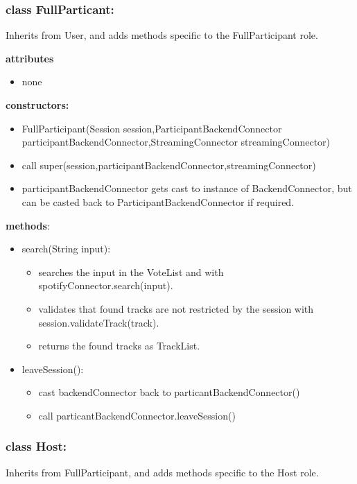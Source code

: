 \documentclass[oneside, ngerman]{sdqtechreport}
\begin{document}
\subsubsection{class FullParticant:}
Inherits from User, and adds methods specific to the FullParticipant role.

\textbf{attributes}
\begin{itemize}
    \item none
\end{itemize}
\textbf{constructors:}
\begin{itemize}
\item FullParticipant(Session session,ParticipantBackendConnector participantBackendConnector,StreamingConnector streamingConnector) 
\end{itemize}
\begin{itemize}
    \item call super(session,participantBackendConnector,streamingConnector)
    \item participantBackendConnector gets cast to instance of BackendConnector, but can be casted back to ParticipantBackendConnector if required.
\end{itemize}
\textbf{methods}:
\begin{itemize}
    \item search(String input):
    \begin{itemize}
        \item searches the input in the VoteList and with spotifyConnector.search(input).
        \item validates that found tracks are not restricted by the session with session.validateTrack(track).
        \item returns the found tracks as TrackList.
    \end{itemize}
    \item leaveSession():
    \begin{itemize}
        \item cast backendConnector back to particantBackendConnector()
        \item call particantBackendConnector.leaveSession()
    \end{itemize}
    
\end{itemize}




\subsubsection{class Host:}
Inherits from FullParticipant, and adds methods specific to the Host role. 
\end{document}
